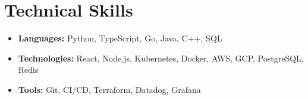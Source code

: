 \documentclass[letterpaper,11pt]{article}
\begin{document}
\section{Technical Skills}
\begin{itemize}[leftmargin=0.15in, label={}]
  \item \textbf{Languages:} Python, TypeScript, Go, Java, C++, SQL \\
  \item \textbf{Technologies:} React, Node.js, Kubernetes, Docker, AWS, GCP, PostgreSQL, Redis \\
  \item \textbf{Tools:} Git, CI/CD, Terraform, Datadog, Grafana
\end{itemize}
\end{document}
